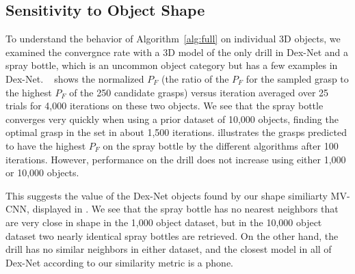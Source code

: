 \subsection{Sensitivity to Object Shape}
To understand the behavior of Algorithm~\ref{alg:full} on individual 3D objects, we examined the convergnce rate with a 3D model of the only drill in Dex-Net and a spray bottle, which is an uncommon object category but has a few examples in Dex-Net.
~ shows the normalized $P_F$ (the ratio of the $P_F$ for the sampled grasp to the highest $P_F$ of the 250 candidate grasps) versus iteration averaged over 25 trials for 4,000 iterations on these two objects.
We see that the spray bottle converges very quickly when using a prior dataset of 10,000 objects, finding the optimal grasp in the set in about 1,500 iterations.
 illustrates the grasps predicted to have the highest $P_F$ on the spray bottle by the different algorithms after 100 iterations.
However, performance on the drill does not increase using either 1,000 or 10,000 objects.

This suggests the value of the Dex-Net objects found by our shape similiarty MV-CNN, displayed in .
We see that the spray bottle has no nearest neighbors that are very close in shape in the 1,000 object dataset, but in the 10,000 object dataset two nearly identical spray bottles are retrieved.
On the other hand, the drill has no similar neighbors in either dataset, and the closest model in all of Dex-Net according to our similarity metric is a phone.

